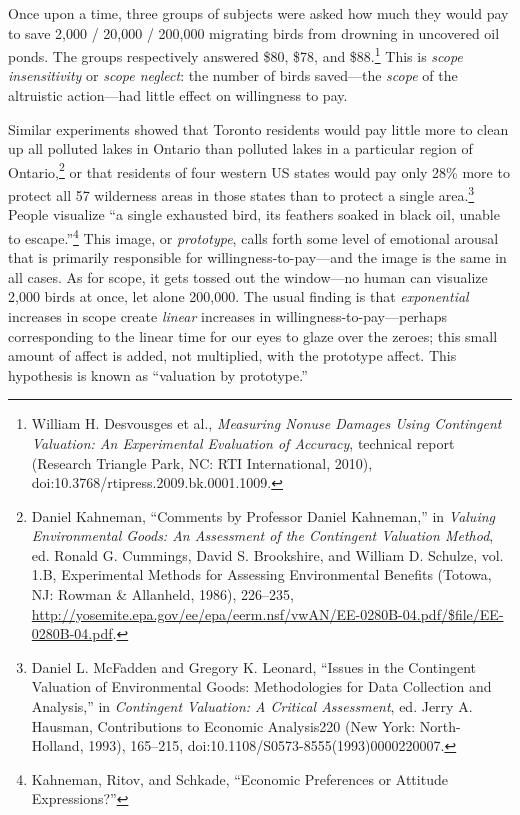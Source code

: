 
{
 Once upon a time, three groups of subjects were asked how much
they would pay to save 2,000 / 20,000 / 200,000 migrating birds from
drowning in uncovered oil ponds. The groups respectively answered \$80,
\$78, and \$88.\footnote{William H. Desvousges et al., \textit{Measuring Nonuse Damages
Using Contingent Valuation: An Experimental Evaluation of Accuracy},
technical report (Research Triangle Park, NC: RTI International, 2010),
doi:10.3768/rtipress.2009.bk.0001.1009.} This is \textit{scope insensitivity}
or \textit{scope neglect}: the number of birds saved---the
\textit{scope} of the altruistic action---had little effect on
willingness to pay. }

{
 Similar experiments showed that Toronto residents would pay little
more to clean up all polluted lakes in Ontario than polluted lakes in a
particular region of Ontario,\footnote{Daniel Kahneman, ``Comments by Professor
Daniel Kahneman,'' in \textit{Valuing Environmental
Goods: An Assessment of the Contingent Valuation Method}, ed. Ronald G.
Cummings, David S. Brookshire, and William D. Schulze, vol. 1.B,
Experimental Methods for Assessing Environmental Benefits (Totowa, NJ:
Rowman \& Allanheld, 1986), 226--235,
\url{http://yosemite.epa.gov/ee/epa/eerm.nsf/vwAN/EE-0280B-04.pdf/\$file/EE-0280B-04.pdf}.} or that residents of
four western US states would pay only 28\% more to protect all 57
wilderness areas in those states than to protect a single
area.\footnote{Daniel L. McFadden and Gregory K. Leonard,
``Issues in the Contingent Valuation of Environmental
Goods: Methodologies for Data Collection and
Analysis,'' in \textit{Contingent Valuation: A
Critical Assessment}, ed. Jerry A. Hausman, Contributions to Economic
Analysis220 (New York: North-Holland, 1993), 165--215,
doi:10.1108/S0573-8555(1993)0000220007.} People visualize ``a single
exhausted bird, its feathers soaked in black oil, unable to
escape.''\footnote{Kahneman, Ritov, and Schkade, ``Economic
Preferences or Attitude Expressions?''} This image, or
\textit{prototype}, calls forth some level of emotional arousal that is
primarily responsible for willingness-to-pay---and the image is the
same in all cases. As for scope, it gets tossed out the window---no
human can visualize 2,000 birds at once, let alone 200,000. The usual
finding is that \textit{exponential} increases in scope create
\textit{linear} increases in willingness-to-pay---perhaps corresponding
to the linear time for our eyes to glaze over the zeroes; this small
amount of affect is added, not multiplied, with the prototype affect.
This hypothesis is known as ``valuation by
prototype.''}


